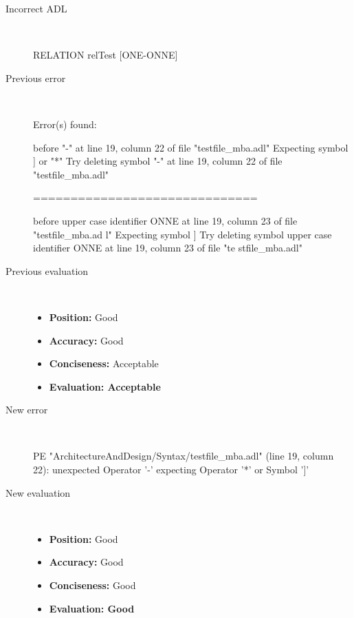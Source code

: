 \hrulefill

\begin{description}
  \item[Incorrect ADL]~\\
\begin{adl}
RELATION relTest [ONE-ONNE]\end{adl}
  \item[Previous error]~\\
\begin{haskell}
Error(s) found:

before "-" at line 19, column 22 of file "testfile_mba.adl"
Expecting symbol ] or "*"
Try deleting symbol "-" at line 19, column 22 of file "testfile_mba.adl"

==============================

before upper case identifier ONNE at line 19, column 23 of file "testfile_mba.ad
l"
Expecting symbol ]
Try deleting symbol upper case identifier ONNE at line 19, column 23 of file "te
stfile_mba.adl"\end{haskell}
  \item[Previous evaluation]~\\
    \begin{itemize}
    \item \textbf{Position:} Good
    \item \textbf{Accuracy:} Good
    \item \textbf{Conciseness:} Acceptable
    \item \textbf{Evaluation: Acceptable}
    \end{itemize}
  \item[New error]~\\
\begin{haskell}
PE "ArchitectureAndDesign/Syntax/testfile_mba.adl" (line 19, column 22):
unexpected Operator '-'
expecting Operator '*' or Symbol ']'\end{haskell}
  \item[New evaluation]~\\
    \begin{itemize}
    \item \textbf{Position:} Good
    \item \textbf{Accuracy:} Good
    \item \textbf{Conciseness:} Good
    \item \textbf{Evaluation: Good}
    \end{itemize}
  \end{description}

